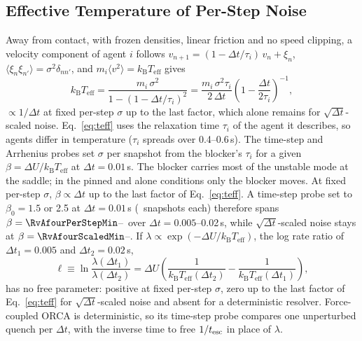 \subsection{Effective Temperature of Per-Step Noise}\label{sec:teff}
Away from contact, with frozen densities, linear friction and no speed clipping, a velocity component of agent $i$ follows $v_{n+1}=(1-\Delta t/\tau_i)\,v_n+\xi_n$, $\langle\xi_n\xi_{n'}\rangle=\sigma^2\delta_{nn'}$, and $m_i\langle v^2\rangle=k_{\mathrm{B}}T_{\mathrm{eff}}$ gives
\begin{equation}\label{eq:teff}
k_{\mathrm{B}}T_{\mathrm{eff}}=\frac{m_i\,\sigma^2}{1-(1-\Delta t/\tau_i)^2}=\frac{m_i\,\sigma^2\tau_i}{2\,\Delta t}\left(1-\frac{\Delta t}{2\tau_i}\right)^{-1},
\end{equation}
$\propto1/\Delta t$ at fixed per-step $\sigma$ up to the last factor, which alone remains for $\sqrt{\Delta t}$-scaled noise. Eq.~\eqref{eq:teff} uses the relaxation time $\tau_i$ of the agent it describes, so agents differ in temperature ($\tau_i$ spreads over 0.4--0.6\,s). The time-step and Arrhenius probes set $\sigma$ per snapshot from the blocker's $\tau_i$ for a given $\beta=\Delta U/k_{\mathrm{B}}T_{\mathrm{eff}}$ at $\Delta t=0.01$\,s. The blocker carries most of the unstable mode at the saddle; in the pinned and alone conditions only the blocker moves.
At fixed per-step $\sigma$, $\beta\propto\Delta t$ up to the last factor of Eq.~\eqref{eq:teff}. A time-step probe set to $\beta_0=1.5$ or 2.5 at $\Delta t=0.01$\,s (\RvAfourNLevel\ snapshots each) therefore spans $\beta=\RvAfourPerStepMin$--\RvAfourPerStepMax\ over $\Delta t=0.005$--0.02\,s, while $\sqrt{\Delta t}$-scaled noise stays at $\beta=\RvAfourScaledMin$--\RvAfourScaledMax. If $\lambda\propto\exp(-\Delta U/k_{\mathrm{B}}T_{\mathrm{eff}})$, the log rate ratio of $\Delta t_1=0.005$ and $\Delta t_2=0.02$\,s,
\begin{equation}\label{eq:ell}
\ell\equiv\ln\frac{\lambda(\Delta t_1)}{\lambda(\Delta t_2)}=\Delta U\left(\frac{1}{k_{\mathrm{B}}T_{\mathrm{eff}}(\Delta t_2)}-\frac{1}{k_{\mathrm{B}}T_{\mathrm{eff}}(\Delta t_1)}\right),
\end{equation}
has no free parameter: positive at fixed per-step $\sigma$, zero up to the last factor of Eq.~\eqref{eq:teff} for $\sqrt{\Delta t}$-scaled noise and absent for a deterministic resolver. Force-coupled ORCA is deterministic, so its time-step probe compares one unperturbed quench per $\Delta t$, with the inverse time to free $1/t_{\rm esc}$ in place of $\lambda$.

